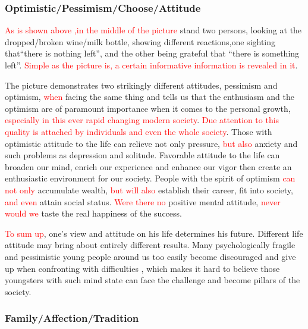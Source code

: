 \documentclass{article}
\begin{document}
\subsubsection{Optimistic/Pessimism/Choose/Attitude}
\label{sec:optimistic}

\hspace{0.4cm} \textcolor{red}{As is shown above ,in the middle of the picture} stand two persons,
looking at the dropped/broken wine/milk bottle, showing different reactions,one sighting
that“there is nothing left”, and the other being grateful that “there is something
left”. \textcolor{red}{Simple as the picture is, a certain informative information is
  revealed in it}. 

\par {The picture demonstrates two strikingly different attitudes}, pessimism and
optimism, \textcolor{red}{when} facing the same thing and tells us that the enthusiasm and
the optimism are of paramount importance when it comes to the personal growth,
\textcolor{red}{especially in this ever rapid changing modern society}. \textcolor{red}{Due
  attention to this quality is attached by individuals and even the whole society}. Those
with optimistic attitude to the life can relieve not only pressure, \textcolor{red}{but
  also} anxiety and such problems as depression and solitude. Favorable attitude to the
life can broaden our mind, enrich our experience and enhance our vigor then create an
enthusiastic environment for our society. People with the spirit of optimism
\textcolor{red}{can not only} accumulate wealth, \textcolor{red}{but will also} establish
their career, fit into society, \textcolor{red}{and even} attain social
status. \textcolor{red}{Were there no} positive mental attitude, \textcolor{red}{never
  would we} taste the real happiness of the success.

\par \textcolor{red}{To sum up}, one’s view and attitude on his life determines his
future. Different life attitude may bring about entirely different results. Many
psychologically fragile and pessimistic young people around us too easily become
discouraged and give up when confronting with difficulties , which makes it hard to
believe those youngsters with such mind state can face the challenge and become pillars of
the society.

\subsubsection{Family/Affection/Tradition}
\label{sec:familyaffection}
\end{document}
